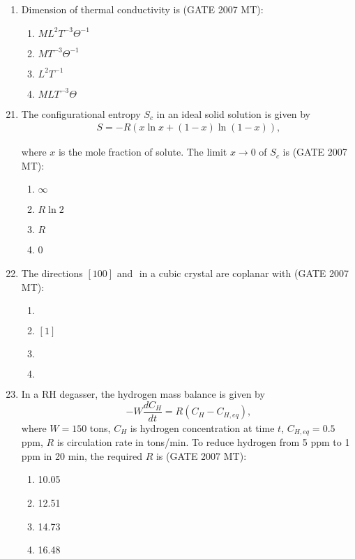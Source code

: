 \documentclass[12pt]{article}
\newcommand{\brak}[1]{\left( #1 \right)}
\begin{document}
\begin{enumerate}
\item Dimension of thermal conductivity is (GATE 2007 MT):
    \begin{enumerate}
        \item $ML^2T^{-3}\Theta^{-1}$
        \item $MT^{-3}\Theta^{-1}$
        \item $L^2T^{-1}$
        \item $MLT^{-3}\Theta$
    \end{enumerate}

\end{enumerate}

\begin{enumerate}

\setcounter{enumi}{20} %

\item The configurational entropy \(S_c\) in an ideal solid solution is given by
\begin{align*}
S = -R \brak{ x \ln x + (1-x) \ln (1-x) },
\end{align*}

where \(x\) is the mole fraction of solute. The limit \(x \to 0\) of \(S_c\) is (GATE 2007 MT):
\begin{enumerate}
  \item \(\infty\)
  \item \(R \ln 2\)
  \item \(R\)
  \item 0
\end{enumerate}

\item The directions \([100]\) and \(\) in a cubic crystal are coplanar with (GATE 2007 MT):
\begin{enumerate}
  \item \(\)
  \item \([1]\)
  \item \(\)
  \item \(\)
\end{enumerate}

\item In a RH degasser, the hydrogen mass balance is given by
\[
- W \frac{dC_H}{dt} = R (C_H - C_{H,eq}),
\]
where \(W=150\) tons, \(C_H\) is hydrogen concentration at time \(t\), \(C_{H,eq}=0.5\) ppm, \(R\) is circulation rate in tons/min. To reduce hydrogen from 5 ppm to 1 ppm in 20 min, the required \(R\) is (GATE 2007 MT):
\begin{enumerate}
  \item 10.05
  \item 12.51
  \item 14.73
  \item 16.48
\end{enumerate}


\end{enumerate}
\end{document}
